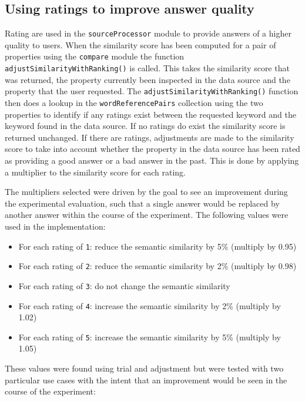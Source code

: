 \documentclass[authoryearcitations]{UoYCSproject}
\begin{document}
\subsection{Using ratings to improve answer quality}
\label{subsec:usingRatings}

Rating are used in the \texttt{sourceProcessor} module to provide answers of a higher quality to users. When the similarity score has been computed for a pair of properties using the \texttt{compare} module the function \texttt{adjustSimilarityWithRanking()} is called. This takes the similarity score that was returned, the property currently been inspected in the data source and the property that the user requested. The \texttt{adjustSimilarityWithRanking()} function then does a lookup in the \texttt{wordReferencePairs} collection using the two properties to identify if any ratings exist between the requested keyword and the keyword found in the data source. If no ratings do exist the similarity score is returned unchanged. If there are ratings, adjustments are made to the similarity score to take into account whether the property in the data source has been rated as providing a good answer or a bad answer in the past. This is done by applying a multiplier to the similarity score for each rating. 

The multipliers selected were driven by the goal to see an improvement during the experimental evaluation, such that a single answer would be replaced by another answer within the course of the experiment. The following values were used in the implementation:

\begin{itemize}
  \item For each rating of \texttt{1}: reduce the semantic similarity by 5\% (multiply by 0.95)
  \item For each rating of \texttt{2}: reduce the semantic similarity by 2\% (multiply by 0.98)
  \item For each rating of \texttt{3}: do not change the semantic similarity
  \item For each rating of \texttt{4}: increase the semantic similarity by 2\% (multiply by 1.02)
  \item For each rating of \texttt{5}: increase the semantic similarity by 5\% (multiply by 1.05)  
\end{itemize}

These values were found using trial and adjustment but were tested with two particular use cases with the intent that an improvement would be seen in the course of the experiment: 
\end{document}
